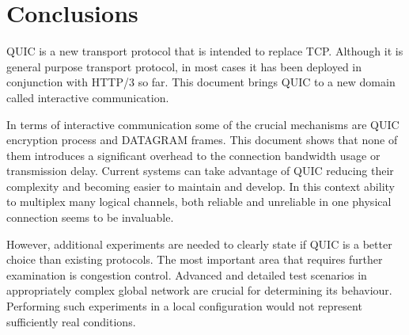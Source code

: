\section{Conclusions}
\label{sec:conclusions}
QUIC is a new transport protocol that is intended to replace TCP\@.
Although it is general purpose transport protocol, in most cases it has been deployed in conjunction with HTTP/3 so far.
This document brings QUIC to a new domain called interactive communication.

In terms of interactive communication some of the crucial mechanisms are QUIC encryption process and DATAGRAM frames.
This document shows that none of them introduces a significant overhead to the connection bandwidth usage or transmission delay.
Current systems can take advantage of QUIC reducing their complexity and becoming easier to maintain and develop.
In this context ability to multiplex many logical channels, both reliable and unreliable in one physical connection seems to be invaluable.

However, additional experiments are needed to clearly state if QUIC is a better choice than existing protocols.
The most important area that requires further examination is congestion control.
Advanced and detailed test scenarios in appropriately complex global network are crucial for determining its behaviour.
Performing such experiments in a local configuration would not represent sufficiently real conditions.
